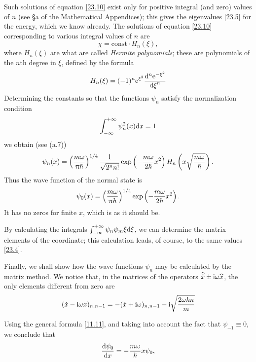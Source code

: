 Such solutions of equation \eqref{23.10} exist only for positive integral (and zero) values of $ n $ (see \S a of the Mathematical Appendices); this gives the eigenvalues \eqref{23.5} for the energy, which we know already. The solutions of equation \eqref{23.10} corresponding to various integral values of $ n $ are 
\[ \chi=\mathrm{const}\cdot H_n(\xi) ,\] 
where $ H_n(\xi) $ are what are called \textit{Hermite polynomials}; these are polynomials of the $ n $th degree in $\xi$, defined by the formula
\begin{equation}\label{23.11}
H_n(\xi)=(-1)^n\mathrm{e}^{\xi^2}\frac{\mathrm{d}^n \mathrm{e}^{-\xi^2}}{{\mathrm{d} \xi}^n}
\end{equation}
Determining the constants so that the functions $\psi_n$ satisfy the normalization condition
\[ \int_{-\infty}^{+\infty}\psi^2_n(x)\mathrm{d} x=1 \]
we obtain (see (a.7))
\begin{equation}\label{23.12}
\psi_n(x)=\left(\frac{m\omega}{\uppi\hbar} \right)^{1/4}\frac{1}{\sqrt{2^n n!}}\exp\left(-\frac{m\omega}{2\hbar}x^2\right)H_n\left( x\sqrt{\frac{m\omega}{\hbar}}\right).
\end{equation}
Thus the wave function of the normal state is
\begin{equation}\label{23.13}
\psi_0(x)=\left(\frac{m\omega}{\uppi\hbar} \right)^{1/4}\exp\left(-\frac{m\omega}{2\hbar}x^2\right).
\end{equation}
It has no zeros for finite $ x $, which is as it should be.

By calculating the integrals $ \int_{-\infty}^{+\infty}\psi_n\psi_m\xi\mathrm{d} \xi $, we can determine the matrix elements of the coordinate; this calculation leads, of course, to the same values \eqref{23.4}.

Finally, we shall show how the wave functions $\psi_n$ may be calculated by the matrix method. We notice that, in the matrices of the operators $ \widehat{\dot{x}}\pm\mathrm{i}\omega\widehat{x} $, the only elements different from zero are
\begin{equation}\label{23.14}
(\dot{x}-\mathrm{i}\omega x)_{n,n-1}=-(\dot{x}+\mathrm{i}\omega)_{n,n-1}-\mathrm{i}\sqrt{\frac{2\omega\hbar n}{m}}
\end{equation}



Using the general formula \eqref{11.11}, and taking into account the fact that $ ψ_{−1}\equiv 0 $, we conclude that
\[ \frac{\mathrm{d} \psi_0}{\mathrm{d} x}=-\frac{m\omega}{\hbar}x\psi_0, \]



